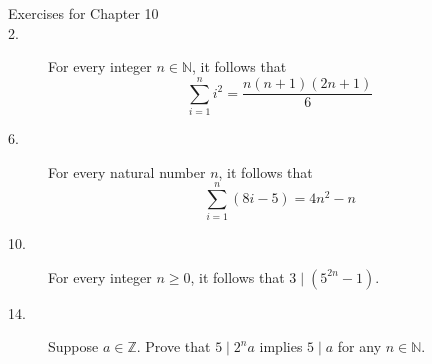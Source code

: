 \documentclass{article}
\begin{document}
\begin{description}
  

\item[Exercises for Chapter 10]
  
\item[2.] For every integer $n\in\mathbb{N}$, it follows that
  \[
  \sum_{i=1}^n i^2 = \frac{n(n+1)(2n+1)}{6}
  \]

\item[6.] For every natural number $n$, it follows that
  \[
  \sum_{i=1}^{n}(8i-5) = 4n^2 - n
  \]

\item[10.] For every integer $n\geq 0$, it follows that $3\mid (5^{2n} - 1)$.


\item[14.]
 Suppose $a\in\mathbb{Z}$.  Prove that $5\mid 2^na$ implies
  $5\mid a$ for any $n\in\mathbb{N}$.

\end{description}
\end{document}
